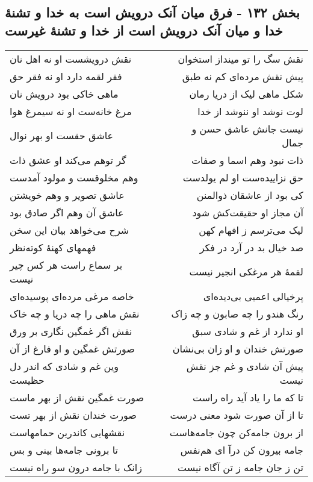 \begin{center}
\section*{بخش ۱۳۲ - فرق میان آنک درویش است به خدا و تشنهٔ خدا و میان آنک درویش است از خدا و تشنهٔ غیرست}
\label{sec:sh132}
\begin{longtable}{l p{0.5cm} r}
نقش درویشست او نه اهل نان
&&
نقش سگ را تو مینداز استخوان
\\
فقر لقمه دارد او نه فقر حق
&&
پیش نقش مرده‌ای کم نه طبق
\\
ماهی خاکی بود درویش نان
&&
شکل ماهی لیک از دریا رمان
\\
مرغ خانه‌ست او نه سیمرغ هوا
&&
لوت نوشد او ننوشد از خدا
\\
عاشق حقست او بهر نوال
&&
نیست جانش عاشق حسن و جمال
\\
گر توهم می‌کند او عشق ذات
&&
ذات نبود وهم اسما و صفات
\\
وهم مخلوقست و مولود آمدست
&&
حق نزاییده‌ست او لم یولدست
\\
عاشق تصویر و وهم خویشتن
&&
کی بود از عاشقان ذوالمنن
\\
عاشق آن وهم اگر صادق بود
&&
آن مجاز او حقیقت‌کش شود
\\
شرح می‌خواهد بیان این سخن
&&
لیک می‌ترسم ز افهام کهن
\\
فهمهای کهنهٔ کوته‌نظر
&&
صد خیال بد در آرد در فکر
\\
بر سماع راست هر کس چیر نیست
&&
لقمهٔ هر مرغکی انجیر نیست
\\
خاصه مرغی مرده‌ای پوسیده‌ای
&&
پرخیالی اعمیی بی‌دیده‌ای
\\
نقش ماهی را چه دریا و چه خاک
&&
رنگ هندو را چه صابون و چه زاک
\\
نقش اگر غمگین نگاری بر ورق
&&
او ندارد از غم و شادی سبق
\\
صورتش غمگین و او فارغ از آن
&&
صورتش خندان و او زان بی‌نشان
\\
وین غم و شادی که اندر دل حظیست
&&
پیش آن شادی و غم جز نقش نیست
\\
صورت غمگین نقش از بهر ماست
&&
تا که ما را یاد آید راه راست
\\
صورت خندان نقش از بهر تست
&&
تا از آن صورت شود معنی درست
\\
نقشهایی کاندرین حمامهاست
&&
از برون جامه‌کن چون جامه‌هاست
\\
تا برونی جامه‌ها بینی و بس
&&
جامه بیرون کن درآ ای هم‌نفس
\\
زانک با جامه درون سو راه نیست
&&
تن ز جان جامه ز تن آگاه نیست
\\
\end{longtable}
\end{center}

